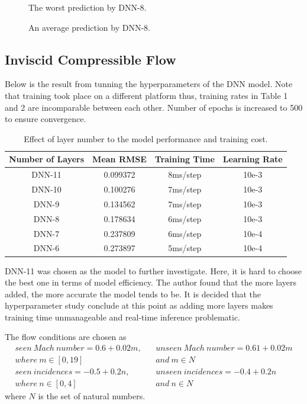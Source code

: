 \documentclass[11pt]{article}
\begin{document}
\begin{figure}[htbp]
    \centering
    
    \caption{The worst prediction by DNN-8.}
\end{figure}

\begin{figure}[htbp]
    \centering
    
    \caption{An average prediction by DNN-8.}
\end{figure}

\subsection{Inviscid Compressible Flow}

Below is the result from tunning the hyperparameters of the DNN model. Note that training took place on a different platform thus, training rates in Table 1 and 2 are incomparable between each other. Number of epochs is increased to 500 to ensure convergence.

\begin{table}[H]
	\centering
	\caption{Effect of layer number to the model performance and training cost.}
	\label{tab:Example}
	\begin{tabular}{cccc}
		\hline
		Number of Layers & Mean RMSE & Training Time & Learning Rate \\ \hline
		DNN-11    & 0.099372 & 8ms/step & 10e-3       \\
		DNN-10    & 0.100276 & 7ms/step & 10e-3       \\
		DNN-9     & 0.134562 & 7ms/step & 10e-3       \\
		DNN-8     & 0.178634 & 6ms/step & 10e-3       \\
		DNN-7     & 0.237809 & 6ms/step & 10e-4       \\
		DNN-6     & 0.273897 & 5ms/step & 10e-4       \\ \hline
	\end{tabular}
\end{table}

DNN-11 was chosen as the model to further investigate. Here, it is hard to choose the best one in terms of model efficiency. The author found that the more layers added, the more accurate the model tends to be. It is decided that the hyperparameter study conclude at this point as adding more layers makes training time unmanageable and real-time inference problematic.

The flow conditions are chosen as
\begin{equation}
	\label{eqn:Example}
	\begin{split}
        seen~Mach~number=0.6+0.02m,~~~~&unseen~Mach~number=0.61+0.02m\\
        where~m\in[0,19]~&and~m\in N \\
		seen~incidences=-0.5+0.2n,~~~~&unseen~incidences=-0.4+0.2n\\
        where~n\in[0,4]~&and~n\in N
	\end{split}
\end{equation}
where $N$ is the set of natural numbers.
\end{document}
